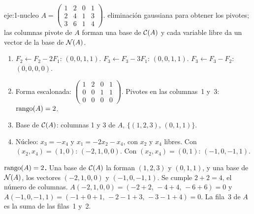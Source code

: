 \begin{solucion}{eje:1-nucleo}
\datos $A=\begin{pmatrix}1&2&0&1\\2&4&1&3\\3&6&1&4\end{pmatrix}$.
\planteamiento eliminación gaussiana para obtener los pivotes; las columnas pivote de $A$ forman una base de $\mathcal{C}(A)$ y cada variable libre da un vector de la base de $\mathcal{N}(A)$.
\pasos
\begin{enumerate}[label=\arabic*.]
  \item $F_2\leftarrow F_2-2F_1$: $(0,0,1,1)$. $F_3\leftarrow F_3-3F_1$: $(0,0,1,1)$. $F_3\leftarrow F_3-F_2$: $(0,0,0,0)$.
  \item Forma escalonada: $\begin{pmatrix}1&2&0&1\\0&0&1&1\\0&0&0&0\end{pmatrix}$. Pivotes en las columnas~1 y~3: $\operatorname{rango}(A)=2$.
  \item Base de $\mathcal{C}(A)$: columnas 1 y 3 de $A$, $\{(1,2,3),\,(0,1,1)\}$.
  \item Núcleo: $x_3=-x_4$ y $x_1=-2x_2-x_4$, con $x_2$ y $x_4$ libres. Con $(x_2,x_4)=(1,0)$: $(-2,1,0,0)$. Con $(x_2,x_4)=(0,1)$: $(-1,0,-1,1)$.
\end{enumerate}
\resultado \textbf{$\operatorname{rango}(A)=2$.} Una base de $\mathcal{C}(A)$ la forman $(1,2,3)$ y $(0,1,1)$, y una base de $\mathcal{N}(A)$, los vectores $(-2,1,0,0)$ y $(-1,0,-1,1)$. Se cumple $2+2=4$, el número de columnas.
\comprobacion $A(-2,1,0,0)=(-2+2,\,-4+4,\,-6+6)=0$ y $A(-1,0,-1,1)=(-1+0+1,\,-2-1+3,\,-3-1+4)=0$. La fila~3 de $A$ es la suma de las filas~1 y~2.
\end{solucion}

